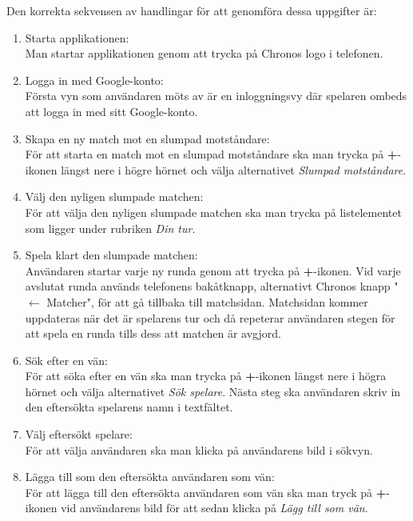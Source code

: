 \documentclass[a4paper, 11pt]{article}
\begin{document}
Den korrekta sekvensen av handlingar för att genomföra dessa uppgifter är:
\begin{enumerate}
\item Starta applikationen:\\
Man startar applikationen genom att trycka på Chronos logo i telefonen.

\item Logga in med Google-konto:\\
Första vyn som användaren möts av är en inloggningsvy där spelaren ombeds att logga in med sitt Google-konto.

\item Skapa en ny match mot en slumpad motståndare:\\ 
För att starta en match mot en slumpad motståndare ska man trycka på \textbf{+}-ikonen längst nere i högre hörnet och välja alternativet \textit{Slumpad motståndare}.

\item Välj den nyligen slumpade matchen:\\ 
För att välja den nyligen slumpade matchen ska man trycka på listelementet som ligger under rubriken \textit{Din tur}. 

\item Spela klart den slumpade matchen:\\ 
Användaren startar varje ny runda genom att trycka på \textbf{+}-ikonen. Vid varje avslutat runda används telefonens bakåtknapp, alternativt Chronos knapp "$\leftarrow$ Matcher", för att gå tillbaka till matchsidan. Matchsidan kommer uppdateras när det är spelarens tur och då repeterar användaren stegen för att spela en runda tills dess att matchen är avgjord. 

\item Sök efter en vän:\\ 
För att söka efter en vän ska man trycka på \textbf{+}-ikonen längst nere i högra hörnet och välja alternativet \textit{Sök spelare}. Nästa steg ska användaren skriv in den eftersökta spelarens namn i textfältet.

\item Välj eftersökt spelare:\\ 
För att välja användaren ska man klicka på användarens bild i sökvyn.

\item Lägga till som den eftersökta användaren som vän:\\
För att lägga till den eftersökta användaren som vän ska man tryck på \textbf{+}-ikonen vid användarens bild för att sedan klicka på \textit{Lägg till som vän}. 


\end{enumerate}
\end{document}
